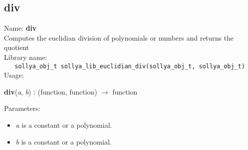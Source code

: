 \subsection{div}
\label{labdiveucl}
\noindent Name: \textbf{div}\\
\phantom{aaa}Computes the euclidian division of polynomials or numbers and returns the quotient\\[0.2cm]
\noindent Library name:\\
\verb|   sollya_obj_t sollya_lib_euclidian_div(sollya_obj_t, sollya_obj_t)|\\[0.2cm]
\noindent Usage: 
\begin{center}
\textbf{div}(\emph{a}, \emph{b}) : (\textsf{function}, \textsf{function}) $\rightarrow$ \textsf{function}\\
\end{center}
Parameters: 
\begin{itemize}
\item \emph{a} is a constant or a polynomial.
\item \emph{b} is a constant or a polynomial.
\end{itemize}
